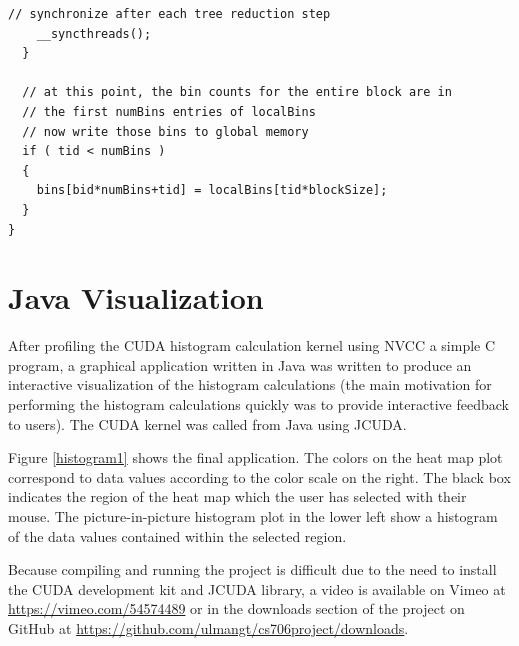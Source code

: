 \documentclass{article}
\begin{document}
\begin{lstlisting}[caption={calculateHistogram3: Per-Thread Sub-Histograms},label={kernel3}]
    // synchronize after each tree reduction step
    __syncthreads();
  }

  // at this point, the bin counts for the entire block are in
  // the first numBins entries of localBins
  // now write those bins to global memory
  if ( tid < numBins )
  {
    bins[bid*numBins+tid] = localBins[tid*blockSize];
  }
}
\end{lstlisting}

\section{Java Visualization}\label{visualization}

After profiling the CUDA histogram calculation kernel using NVCC a simple C program, a graphical application written in Java was written to produce an interactive visualization of the histogram calculations (the main motivation for performing the histogram calculations quickly was to provide interactive feedback to users). The CUDA kernel was called from Java using JCUDA\cite{jcuda}.

Figure \ref{histogram1} shows the final application. The colors on the heat map plot correspond to data values according to the color scale on the right. The black box indicates the region of the heat map which the user has selected with their mouse. The picture-in-picture histogram plot in the lower left show a histogram of the data values contained within the selected region.

Because compiling and running the project is difficult due to the need to install the CUDA development kit and JCUDA library, a video is available on Vimeo at \url{https://vimeo.com/54574489} or in the downloads section of the project on GitHub at \url{https://github.com/ulmangt/cs706project/downloads}.
\end{document}
